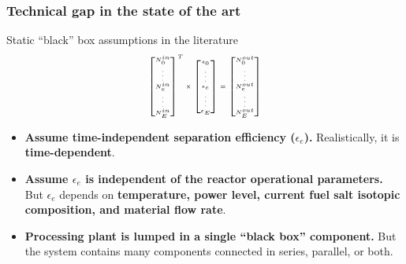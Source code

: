 \begin{frame}
\frametitle{Technical gap in the state of the art}
\vspace{-0.2in}
\begin{block}{Static ``black'' box assumptions in the literature}
	\begin{equation*}
	{\tiny  
		\setlength{\abovedisplayskip}{6pt}
		\setlength{\belowdisplayskip}{\abovedisplayskip}
		\setlength{\abovedisplayshortskip}{0pt}
		\setlength{\belowdisplayshortskip}{3pt}
	\begin{aligned}
	\begin{bmatrix}
	N^{in}_{0} \\ \vdots \\ N^{in}_{e} \\ \vdots \\ N^{in}_{E} \\
	\end{bmatrix}^T
	\times
	\begin{bmatrix}
	\epsilon_{0} \\ \vdots \\ \epsilon_{e} \\ \vdots \\ \epsilon_{E} \\
	\end{bmatrix} =
	\begin{bmatrix}
	N^{out}_{0}\\ \vdots \\ N^{out}_{e} \\ \vdots \\N^{out}_{E}  \\
	\end{bmatrix}
	\end{aligned}
	}
	\end{equation*}
	\begin{itemize}
		\item \textbf{Assume time-independent separation efficiency ($\epsilon_e$).} Realistically, 
		it is \textbf{time-dependent}.
		\item \textbf{Assume $\epsilon_e$ is independent of the reactor operational 
		parameters.} But $\epsilon_e$ depends on \textbf{temperature, power level, current fuel salt isotopic composition, and material flow rate}.
		\item \textbf{Processing plant is lumped in a single ``black	box'' component.} But the system contains many components connected in series, parallel, or both. 
	\end{itemize}
\end{block}
\end{frame}

